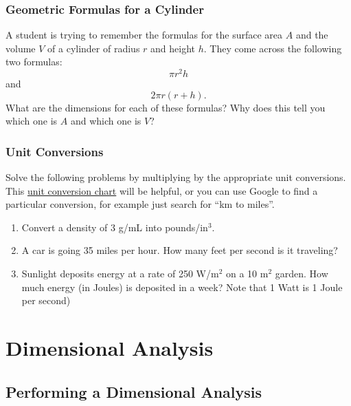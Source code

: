 \documentclass[
]{book}
\begin{document}
\hypertarget{geometric-formulas-for-a-cylinder}{%
\subsection{Geometric Formulas for a Cylinder}\label{geometric-formulas-for-a-cylinder}}

A student is trying to remember the formulas for the surface area \(A\) and the volume \(V\) of a cylinder of radius \(r\) and height \(h\). They come across the following two formulas:
\[ \pi r^2 h\]
and
\[ 2\pi r (r+h).\]
What are the dimensions for each of these formulas? Why does this tell you which one is \(A\) and which one is \(V\)?

\hypertarget{unit-conversions}{%
\subsection{Unit Conversions}\label{unit-conversions}}

Solve the following problems by multiplying by the appropriate unit conversions.
This \href{https://www.mustangps.org/Downloads/conversion_chart.pdf}{unit conversion chart} will be helpful, or you can use Google to find a particular conversion, for example just search for ``km to miles''.

\begin{enumerate}
\def\labelenumi{\arabic{enumi}.}
\item
  Convert a density of 3 g/mL into pounds/in\(^3\).
\item
  A car is going 35 miles per hour. How many feet per second is it traveling?
\item
  Sunlight deposits energy at a rate of 250 W/m\(^2\) on a 10 m\(^2\) garden. How much energy (in Joules) is deposited in a week? Note that 1 Watt is 1 Joule per second)
\end{enumerate}

\hypertarget{dimensional-analysis}{%
\chapter{Dimensional Analysis}\label{dimensional-analysis}}

\hypertarget{performing-a-dimensional-analysis}{%
\section{Performing a Dimensional Analysis}\label{performing-a-dimensional-analysis}}
\end{document}
